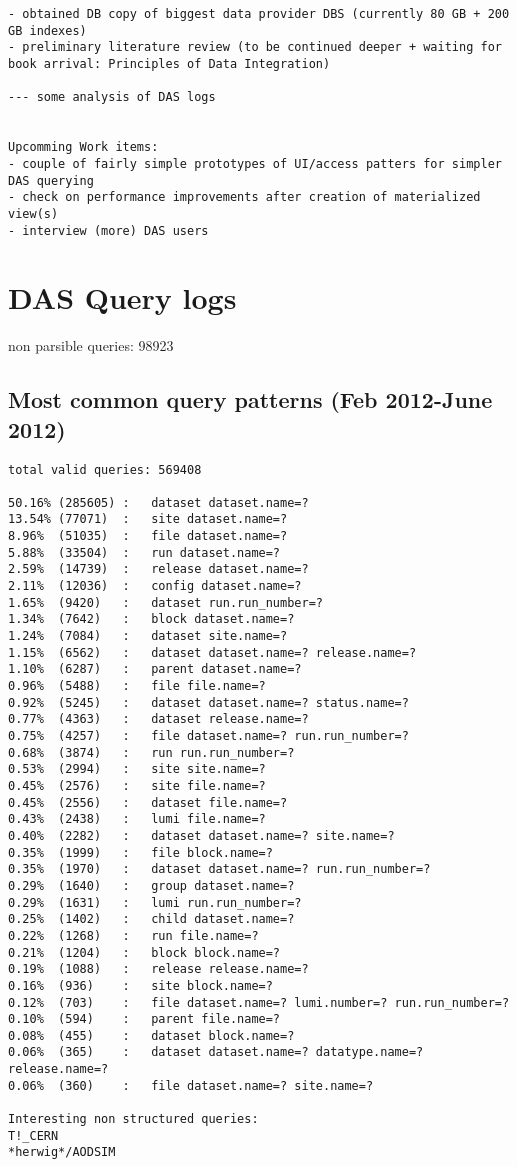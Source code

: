 \documentclass[a4paper,11pt,draft]{article}
\begin{document}
\begin{verbatim}
- obtained DB copy of biggest data provider DBS (currently 80 GB + 200 GB indexes)
- preliminary literature review (to be continued deeper + waiting for book arrival: Principles of Data Integration)

--- some analysis of DAS logs


Upcomming Work items:
- couple of fairly simple prototypes of UI/access patters for simpler DAS querying
- check on performance improvements after creation of materialized view(s)
- interview (more) DAS users
\end{verbatim}



\thispagestyle{empty}


\pagebreak
\appendix
\section{DAS Query logs}

non parsible queries: 98923

\subsection*{Most common query patterns (Feb 2012-June 2012)}
\begin{verbatim}
total valid queries: 569408

50.16% (285605) :	dataset dataset.name=?
13.54% (77071)  :	site dataset.name=?
8.96%  (51035) 	:	file dataset.name=?
5.88%  (33504) 	:	run dataset.name=?
2.59%  (14739) 	:	release dataset.name=?
2.11%  (12036) 	:	config dataset.name=?
1.65%  (9420) 	:	dataset run.run_number=?
1.34%  (7642) 	:	block dataset.name=?
1.24%  (7084) 	:	dataset site.name=?
1.15%  (6562) 	:	dataset dataset.name=? release.name=?
1.10%  (6287) 	:	parent dataset.name=?
0.96%  (5488) 	:	file file.name=?
0.92%  (5245) 	:	dataset dataset.name=? status.name=?
0.77%  (4363) 	:	dataset release.name=?
0.75%  (4257) 	:	file dataset.name=? run.run_number=?
0.68%  (3874) 	:	run run.run_number=?
0.53%  (2994) 	:	site site.name=?
0.45%  (2576) 	:	site file.name=?
0.45%  (2556) 	:	dataset file.name=?
0.43%  (2438) 	:	lumi file.name=?
0.40%  (2282) 	:	dataset dataset.name=? site.name=?
0.35%  (1999) 	:	file block.name=?
0.35%  (1970) 	:	dataset dataset.name=? run.run_number=?
0.29%  (1640) 	:	group dataset.name=?
0.29%  (1631) 	:	lumi run.run_number=?
0.25%  (1402) 	:	child dataset.name=?
0.22%  (1268) 	:	run file.name=?
0.21%  (1204) 	:	block block.name=?
0.19%  (1088) 	:	release release.name=?
0.16%  (936) 	:	site block.name=?
0.12%  (703) 	:	file dataset.name=? lumi.number=? run.run_number=?
0.10%  (594) 	:	parent file.name=?
0.08%  (455) 	:	dataset block.name=?
0.06%  (365) 	:	dataset dataset.name=? datatype.name=? release.name=?
0.06%  (360) 	:	file dataset.name=? site.name=?

Interesting non structured queries:
T!_CERN
*herwig*/AODSIM

\end{verbatim}
\end{document}
